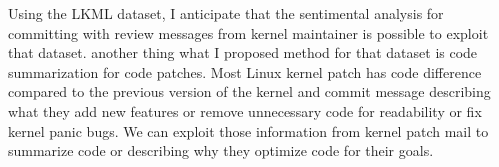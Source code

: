 Using the LKML dataset, I anticipate that the sentimental analysis for
committing with review messages from kernel maintainer is possible to exploit
that dataset. another thing
what I proposed method for that dataset is code summarization for code patches.
Most Linux kernel patch has code difference compared
to the previous version of the kernel and commit message describing what they
add new features or remove unnecessary code
for readability or fix kernel panic bugs. We can exploit those
information from kernel patch mail to summarize code or
describing why they optimize code for their goals.
